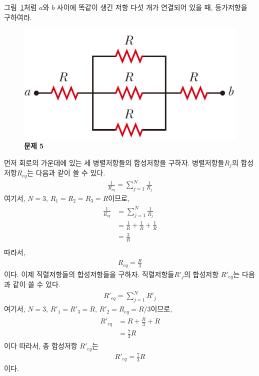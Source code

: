 \documentclass[tightenlines,floatfix,nofootinbib,superscriptaddress,fleqn]{revtex4}
\begin{document}
\vspace{1.cm}

그림~\ref{fig:2}처럼 $a$와 $b$ 사이에 똑같이 생긴 저항 다섯 개가
연결되어 있을 때, 등가저항을 구하여라. 
\begin{figure}[htp]
  \centering
  \includegraphics[scale=0.45]{qfig5-20220914-2.pdf}
  \caption{\textbf{문제 5}}
  \label{fig:2}
\end{figure}
\vspace{1.cm}

먼저 회로의 가운데에 있는 세 병렬저항들의 합성저항을 구하자.
병렬저항들$R_j$의 합성저항$R_{eq}$는 다음과 같이 쓸 수 있다.
\begin{align}
  \frac{1}{R_{eq}}=\sum^{N}_{j=1}\frac{1}{R_j}
\end{align}
여기서, $N=3$, $R_1=R_2=R_3=R$이므로,
\begin{align}
  \begin{split}
   \frac{1}{R_{eq}}&=\sum^{N}_{j=1}\frac{1}{R_j}\\
   &=\frac{1}{R}+\frac{1}{R}+\frac{1}{R}\\
   &=\frac{3}{R}\\ 
  \end{split}
\end{align}
따라서,
\begin{align}
  R_{eq}=\frac{R}{3}
\end{align}
이다. 이제 직렬저항들의 합성저항들을 구하자. 직렬저항들$R'_j$의 합성저항
$R'_{eq}$는 다음과 같이 쓸 수 있다.
\begin{align}
  R'_{eq}=\sum^N_{j=1}R'_j
\end{align}
여기서, $N=3$, $R'_1=R'_3=R$, $R'_2=R_{eq}=R/3$이므로,
\begin{align}
  \begin{split}
    R'_{eq}&=R+\frac{R}{3}+R\\
    &=\frac{7}{3}R
  \end{split}
\end{align}
이다 따라서, 총 합성저항 $R'_{eq}$는
\begin{align}
  R'_{eq}=\frac{7}{3}R
\end{align}
이다.
\end{document}
